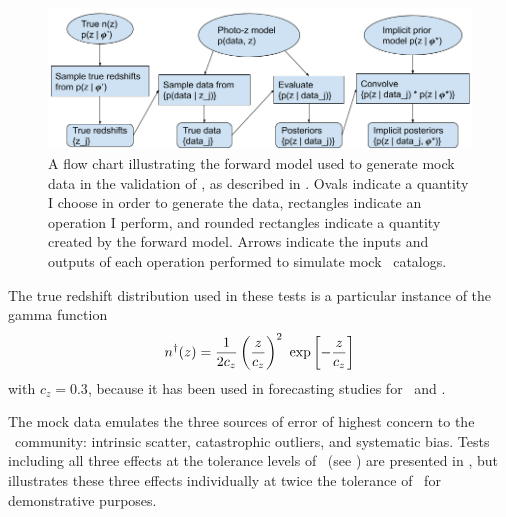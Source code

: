 \begin{figure}
	\begin{center}
		\includegraphics[width=\textwidth]{figures/chippr/flowchart.png}
		\caption{A flow chart illustrating the forward model used to generate mock data in the validation of \Chippr, as described in .
		Ovals indicate a quantity I choose in order to generate the data, rectangles indicate an operation I perform, and rounded rectangles indicate a quantity created by the forward model.
		Arrows indicate the inputs and outputs of each operation performed to simulate mock \pzpdf\ catalogs.}
	\end{center}
\end{figure}

The true redshift distribution used in these tests is a particular instance of the gamma function
\begin{equation}
\eqlabel{eqn:gamma}
n^{\dagger}(z) = \frac{1}{2 c_{z}} \left(\frac{z}{c_{z}}\right)^{2}\ \exp\left[-\frac{z}{c_{z}}\right]
\end{equation}
with $c_{z} = 0.3$, because it has been used in forecasting studies for \des\ and \lsst.

The mock data emulates the three sources of error of highest concern to the \pz\ community: intrinsic scatter, catastrophic outliers, and systematic bias.
Tests including all three effects at the tolerance levels of \lsst\ (see ) are presented in , but  illustrates these three effects individually at twice the tolerance of \lsst\ for demonstrative purposes.

